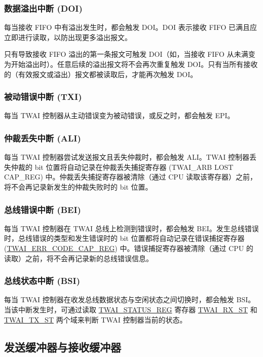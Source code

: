 \documentclass[main\_\_CN.tex]{subfiles}
\begin{document}
\subsubsection{数据溢出中断 (DOI)}
每当接收 FIFO 中有溢出发生时，都会触发 DOI。DOI 表示接收 FIFO 已满且应立即进行读取，以防出现更多溢出报文。

只有导致接收 FIFO 溢出的第一条报文可触发 DOI（如，当接收 FIFO 从未满变为开始溢出时）。任意后续的溢出报文将不会再次重复触发 DOI。只有当所有接收的（有效报文或溢出）报文都被读取后，才能再次触发 DOI。

\subsubsection{被动错误中断 (TXI)}
每当 TWAI 控制器从主动错误变为被动错误，或反之时，都会触发 EPI。

\subsubsection{仲裁丢失中断 (ALI)}
每当 TWAI 控制器尝试发送报文且丢失仲裁时，都会触发 ALI。TWAI 控制器丢失仲裁的 bit 位置将自动记录在仲裁丢失捕捉寄存器 (TWAI\_ARB LOST CAP\_REG) 中。仲裁丢失捕捉寄存器被清除（通过 CPU 读取该寄存器）之前，将不会再记录新发生的仲裁失败时的 bit 位置。

\subsubsection{总线错误中断 (BEI)}
每当 TWAI 控制器在 TWAI 总线上检测到错误时，都会触发 BEI。发生总线错误时，总线错误的类型和发生错误时的 bit 位置都将自动记录在错误捕捉寄存器 (\hyperref[regdesc:TWAIERRCODECAPREG]{TWAI\_ERR\_CODE\_CAP\_REG}) 中。错误捕捉寄存器被清除（通过 CPU 的读取）之前，将不会再记录新的总线错误信息。

\subsubsection{总线状态中断 (BSI)}
每当 TWAI 控制器在收发总线数据状态与空闲状态之间切换时，都会触发 BSI。当该中断发生时，可通过读取 \hyperref[regdesc:TWAISTATUSREG]{TWAI\_STATUS\_REG} 寄存器 \hyperref[fielddesc:TWAIRXST]{TWAI\_RX\_ST} 和 \hyperref[fielddesc:TWAITXST]{TWAI\_TX\_ST} 两个域来判断 TWAI 控制器当前的状态。

\subsection{发送缓冲器与接收缓冲器}
\end{document}
